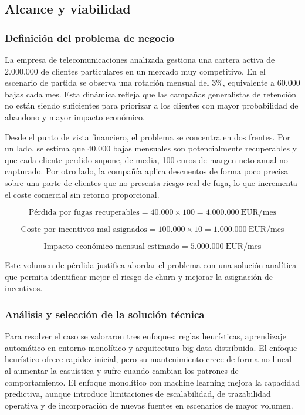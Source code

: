 \documentclass[12pt,a4paper]{article}
\begin{document}
\subsection{Alcance y viabilidad}

\subsubsection{Definición del problema de negocio}

La empresa de telecomunicaciones analizada gestiona una cartera activa de 2.000.000 de clientes particulares en un mercado muy competitivo. En el escenario de partida se observa una rotación mensual del 3\%, equivalente a 60.000 bajas cada mes. Esta dinámica refleja que las campañas generalistas de retención no están siendo suficientes para priorizar a los clientes con mayor probabilidad de abandono y mayor impacto económico.

Desde el punto de vista financiero, el problema se concentra en dos frentes. Por un lado, se estima que 40.000 bajas mensuales son potencialmente recuperables y que cada cliente perdido supone, de media, 100 euros de margen neto anual no capturado. Por otro lado, la compañía aplica descuentos de forma poco precisa sobre una parte de clientes que no presenta riesgo real de fuga, lo que incrementa el coste comercial sin retorno proporcional.

\[
\text{Pérdida por fugas recuperables} = 40.000 \times 100 = 4.000.000\ \text{EUR/mes}
\]

\[
\text{Coste por incentivos mal asignados} = 100.000 \times 10 = 1.000.000\ \text{EUR/mes}
\]

\[
\text{Impacto económico mensual estimado} = 5.000.000\ \text{EUR/mes}
\]

Este volumen de pérdida justifica abordar el problema con una solución analítica que permita identificar mejor el riesgo de churn y mejorar la asignación de incentivos.

\subsubsection{Análisis y selección de la solución técnica}

Para resolver el caso se valoraron tres enfoques: reglas heurísticas, aprendizaje automático en entorno monolítico y arquitectura big data distribuida. El enfoque heurístico ofrece rapidez inicial, pero su mantenimiento crece de forma no lineal al aumentar la casuística y sufre cuando cambian los patrones de comportamiento. El enfoque monolítico con machine learning mejora la capacidad predictiva, aunque introduce limitaciones de escalabilidad, de trazabilidad operativa y de incorporación de nuevas fuentes en escenarios de mayor volumen.
\end{document}
